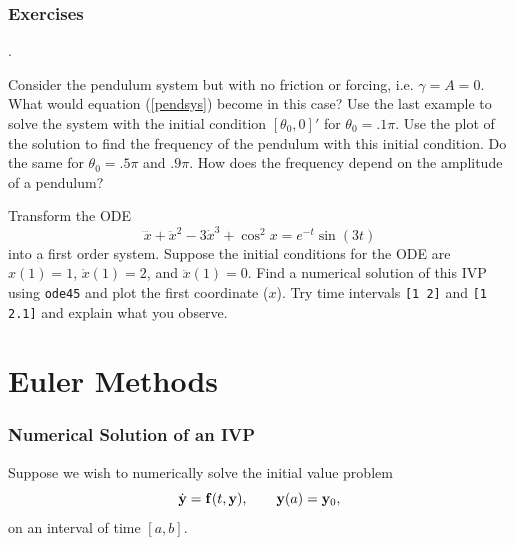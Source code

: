 \subsection*{Exercises}
\begin{list}
{.}{}

\item Consider the pendulum system  but with no friction or forcing,
i.e. $\gamma = A = 0$. What would equation (\ref{pendsys}) become in this case?
Use the last example to solve the system
with the initial condition $[\theta_0,0]'$ for $\theta_0 = .1\pi$.
Use the plot of the solution to find the frequency of the pendulum
with this initial condition. Do the same for $\theta_0 = .5\pi$ and $.9 \pi$.
How does the frequency depend on the amplitude of a pendulum?



\item Transform the ODE
$$
       \dddot{x} + \ddot{x}^2 - 3\dot{x}^3 + \cos^2{x} = e^{-t} \sin(3t)
$$
 into a first order system.
Suppose the initial conditions for the ODE are
$x(1) = 1$, $\dot{x}(1) = 2$, and $\ddot{x}(1) = 0$.
Find a numerical solution of this IVP using \verb&ode45&
and plot the first coordinate ($x$). Try time intervals
\verb&[1 2]& and \verb&[1 2.1]& and explain
what you observe. 

\end{list}




\chapter{Euler Methods}


\subsection*{Numerical Solution of an IVP}

Suppose we wish to numerically solve the initial value problem
\begin{equation}\label{IVP}
\dot{\mathbf{y}} = \mathbf{f}(t,\mathbf{y}), \qquad \mathbf{y}(a) = \mathbf{y}_0,
\end{equation}
on an interval of time $[a,b]$.

